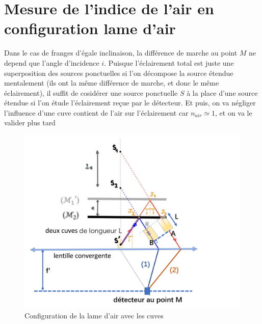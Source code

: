 \documentclass[a4paper,12pt]{book}
\begin{document}
\renewcommand{\labelitemi}{$\blacktriangleright$}
\renewcommand{\labelitemii}{$\bullet$}


\section{Mesure de l'indice de l'air en configuration lame d'air}
Dans le cas de franges d'égale inclinaison, la différence de marche au point $M$ ne 
depend que l'angle d'incidence $i$. Puisque l'éclairement total est juste 
une superposition des sources ponctuelles si l'on décompose la source étendue mentalement
(ils ont la même différence de marche, et donc le même éclairement), il suffit de cosidérer 
une source ponctuelle $S$ à la place d'une source étendue si l'on étude l'éclairement reçue par le détecteur. 
Et puis, on va négliger l'influence d'une cuve contient de l'air sur l'éclairement car 
$n_{air} \simeq 1$, et on va le valider plus tard
\begin{figure}[h]
    \centering    
    \includegraphics[scale=0.7]{tr8.png}
    \caption{Configuration de la lame d'air avec les cuves}   
\end{figure}
\end{document}
